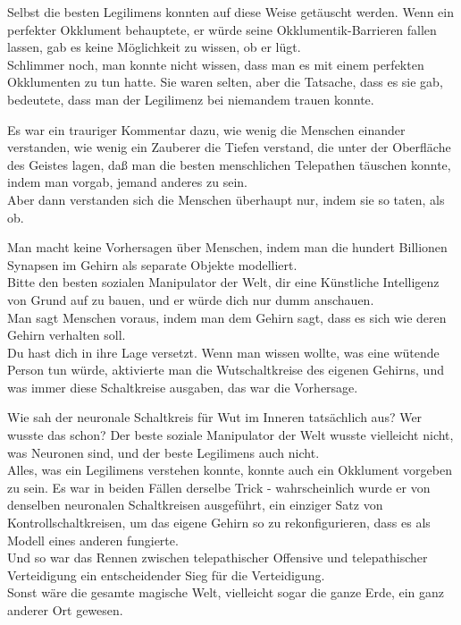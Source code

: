 {Selbst die besten Legilimens konnten auf diese Weise getäuscht werden. Wenn ein perfekter Okklument behauptete, er würde seine Okklumentik-Barrieren fallen lassen, gab es keine Möglichkeit zu wissen, ob er lügt.\\ Schlimmer noch, man konnte nicht wissen, dass man es mit einem perfekten Okklumenten zu tun hatte. Sie waren selten, aber die Tatsache, dass es sie gab, bedeutete, dass man der Legilimenz bei niemandem trauen konnte.

Es war ein trauriger Kommentar dazu, wie wenig die Menschen einander verstanden, wie wenig ein Zauberer die Tiefen verstand, die unter der Oberfläche des Geistes lagen, daß man die besten menschlichen Telepathen täuschen konnte, indem man vorgab, jemand anderes zu sein.\\ Aber dann verstanden sich die Menschen überhaupt nur, indem sie so taten, als ob.

Man macht keine Vorhersagen über Menschen, indem man die hundert Billionen Synapsen im Gehirn als separate Objekte modelliert.\\ Bitte den besten sozialen Manipulator der Welt, dir eine Künstliche Intelligenz von Grund auf zu bauen, und er würde dich nur dumm anschauen.\\ Man sagt Menschen voraus, indem man dem Gehirn sagt, dass es sich wie deren Gehirn verhalten soll.\\ Du hast dich in ihre Lage versetzt. Wenn man wissen wollte, was eine wütende Person tun würde, aktivierte man die Wutschaltkreise des eigenen Gehirns, und was immer diese Schaltkreise ausgaben, das war die Vorhersage.

Wie sah der neuronale Schaltkreis für Wut im Inneren tatsächlich aus? Wer wusste das schon? Der beste soziale Manipulator der Welt wusste vielleicht nicht, was Neuronen sind, und der beste Legilimens auch nicht.\\ Alles, was ein Legilimens verstehen konnte, konnte auch ein Okklument vorgeben zu sein. Es war in beiden Fällen derselbe Trick - wahrscheinlich wurde er von denselben neuronalen Schaltkreisen ausgeführt, ein einziger Satz von Kontrollschaltkreisen, um das eigene Gehirn so zu rekonfigurieren, dass es als Modell eines anderen fungierte.\\ Und so war das Rennen zwischen telepathischer Offensive und telepathischer Verteidigung ein entscheidender Sieg für die Verteidigung.\\ Sonst wäre die gesamte magische Welt, vielleicht sogar die ganze Erde, ein ganz anderer Ort gewesen.

}
